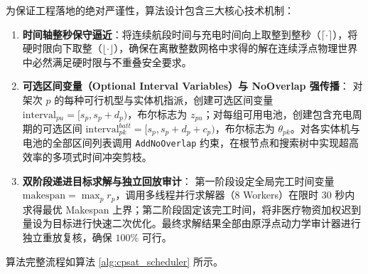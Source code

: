 \documentclass[withoutpreface,bwprint]{format}
\begin{document}
为保证工程落地的绝对严谨性，算法设计包含三大核心技术机制：
\begin{enumerate}[leftmargin=*]
    \item \textbf{时间轴整秒保守逼近}：将连续航段时间与充电时间向上取整到整秒（$\lceil \cdot \rceil$），将硬时限向下取整（$\lfloor \cdot \rfloor$），确保在离散整数网格中求得的解在连续浮点物理世界中必然满足硬时限与不重叠安全要求。
    \item \textbf{可选区间变量（Optional Interval Variables）与 NoOverlap 强传播}：
    对架次 $p$ 的每种可行机型与实体机指派，创建可选区间变量 $\text{interval}_{pu} = [s_p, s_p + d_p)$，布尔标志为 $z_{pu}$；对每组可用电池，创建包含充电周期的可选区间 $\text{interval}_{pk}^{batt} = [s_p, s_p + d_p + c_p)$，布尔标志为 $\theta_{pk}$。对各实体机与电池的全部区间列表调用 \texttt{AddNoOverlap} 约束，在根节点和搜索树中实现超高效率的多项式时间冲突剪枝。
    \item \textbf{双阶段递进目标求解与独立回放审计}：
    第一阶段设定全局完工时间变量 $\text{makespan} = \max_p r_p$，调用多线程并行求解器（8 Workers）在限时 30 秒内求得最优 Makespan 上界；第二阶段固定该完工时间，将非医疗物资加权迟到量设为目标进行快速二次优化。最终求解结果全部由原浮点动力学审计器进行独立重放复核，确保 $100\%$ 可行。
\end{enumerate}

算法完整流程如算法 \ref{alg:cpsat_scheduler} 所示。
\end{document}
